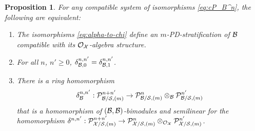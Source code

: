 \documentclass{article}
\theoremstyle{change}
\newtheorem{prop}[subsubsection]{Proposition}
\numberwithin{equation}{subsubsection}
\begin{document}
\begin{prop}\label{prop:m-PD-stratified-algebra}
  For any compatible system of isomorphisms \ref{eq:cP_B^n}, the
  following are equivalent:
  \begin{enumerate}
  \item The isomorphisms \ref{eq:alpha-to-chi} define an
    $m$-PD-stratification of ${\cal B}$ compatible with its
    ${\cal O}_{\cal X}$-algebra structure.
  \item For all $n$, $n'\ge0$,
    $\delta^{n,n'}_{{\cal B},0}=\delta^{n,n'}_{{\cal B},1}$. 
  \item There is a ring homomorphism
    \begin{equation}
      \label{eq:delta^B1}
      \delta^{n,n'}_{\cal B}:{\cal P}^{n+n'}_{{\cal B}/{\cal S},(m)}\to{\cal P}^n_{{\cal B}/{\cal S},(m)}
      \otimes_{\cal B}{\cal P}^{n'}_{{\cal B}/{\cal S},(m)}     
    \end{equation}
    that is a homomorphism of $({\cal B},{\cal B})$-bimodules and semilinear for
    the homomorphism
    $\delta^{n,n'}:{\cal P}^{n+n'}_{{\cal X}/{\cal S},(m)}\to{\cal P}^n_{{\cal X}/{\cal S},(m)}
    \otimes_{{\cal O}_{\cal X}}{\cal P}^{n'}_{{\cal X}/{\cal S},(m)}$.
  \end{enumerate}
\end{prop}
\end{document}
